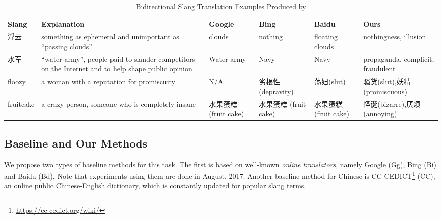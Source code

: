 \begin{table*}[th!]
	\small
	\centering
	\caption{Bidirectional Slang Translation Examples Produced by \socvec}
	\begin{tabular}{L{1.2cm}|L{4.7cm}|L{1.7cm}|L{1.7cm}|L{1.7cm}|L{2.8cm}}
		\textbf{Slang} & \textbf{Explanation} & \textbf{Google}& \textbf{Bing}& \textbf{Baidu} & \textbf{Ours} \\ \hline 
		浮云 &something as ephemeral and unimportant as ``passing clouds''& clouds& nothing& floating clouds & nothingness, illusion \\ \hline
		水军 &``water army'', people paid to slander competitors on the Internet and to help shape public opinion& Water army& Navy& Navy & propaganda, complicit, fraudulent\\ \hline
		floozy & a woman with a reputation for promiscuity & N/A&劣根性 (depravity)&荡妇(slut)&骚货(slut),妖精(promiscuous)\\ \hline
		fruitcake& a crazy person, someone who is completely insane & 水果蛋糕 \quad(fruit cake)&水果蛋糕 \qquad(fruit cake)&水果蛋糕 \quad(fruit cake)& 怪诞(bizarre),厌烦(annoying)\\  
	\end{tabular}
	\label{tab:bleis_3}
\end{table*}
\subsection{Baseline and Our Methods} 
We propose two types of baseline methods for this task. 
The first is based on well-known {\em online translators}, 
namely Google (Gg), 
Bing (Bi) and Baidu (Bd). Note that experiments using them are done in August, 2017.
Another baseline method for Chinese is  CC-CEDICT\footnote{\scriptsize {\url{https://cc-cedict.org/wiki/}}} (CC), an online public Chinese-English dictionary, which is constantly updated for popular slang terms. 

